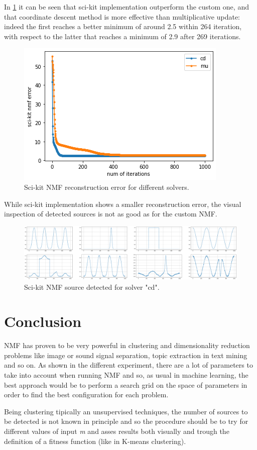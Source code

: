 \documentclass[a4paper,10pt]{report}
\begin{document}
In \ref{fig:sknmf_err} it can be seen that sci-kit implementation outperform the custom one, and that coordinate descent method is more effective than multiplicative update: indeed the first reaches a better minimum of around 2.5 within 264 iteration, with respect to the latter that reaches a minimum of 2.9 after 269 iterations.
\begin{figure}[h]
    \center
    \includegraphics[width=0.6\linewidth]{sknmf_err.png}
    \caption{Sci-kit NMF reconstruction error for different solvers.}
    \label{fig:sknmf_err}
\end{figure}
While sci-kit implementation shows a smaller reconstruction error, the visual inspection of detected sources is not as good as for the custom NMF.
\begin{figure}[h]
    \center
    \includegraphics[width=1\linewidth]{sknmf_cd_4.png}
    \caption{Sci-kit NMF source detected for solver "cd".}
    \label{fig:sknmf_cd_4}
\end{figure}

\chapter{Conclusion}\label{chap:conclusion}
NMF has proven to be very powerful in clustering and dimensionality reduction problems like image or sound signal separation, topic extraction in text mining and so on.
As shown in the different experiment, there are a lot of parameters to take into account when running NMF and so, as usual in machine learning, the best approach would be to perform a search grid on the space of parameters in order to find the best configuration for each problem.

Being clustering tipically an unsupervised techniques, the number of sources to be detected is not known in principle and so the procedure should be to try for different values of input \emph{m} and asses results both visually and trough the definition of a fitness function (like in K-means clustering). 
\end{document}

